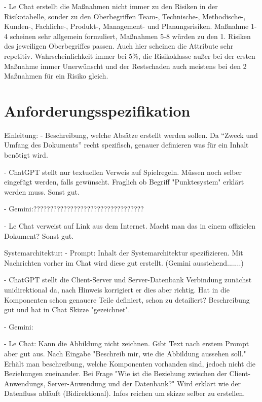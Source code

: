 - Le Chat erstellt die Maßnahmen nicht immer zu den Risiken in der Risikotabelle, sonder zu den Oberbegriffen Team-, Technische-, Methodische-, 
Kunden-, Fachliche-, Produkt-, Management- und Planungsrisiken. Maßnahme 1-4 scheinen sehr allgemein formuliert, Maßnahmen 5-8 würden
zu den 1. Risiken des jeweiligen Oberbegriffes passen. Auch hier scheinen die Attribute sehr repetitiv. Wahrscheinlichkeit immer bei 5\%,
die Risikoklasse außer bei der ersten Maßnahme immer Unerwünscht und der Restschaden auch meistens bei den 2 Maßnahmen für ein Risiko gleich.

\section{Anforderungsspezifikation}  \label{CompAnforderungsspezifikation}

Einleitung:
- Beschreibung, welche Absätze erstellt werden sollen. Da ``Zweck und Umfang des Dokuments'' recht spezifisch, genauer definieren was für ein 
Inhalt benötigt wird.

- ChatGPT stellt nur textuellen Verweis auf Spielregeln. Müssen noch selber eingefügt werden, falls gewünscht. Fraglich ob Begriff "Punktesystem"
erklärt werden muss. Sonst gut.

- Gemini:?????????????????????????????????

- Le Chat verweist auf Link aus dem Internet. Macht man das in einem offizielen Dokument? Sonst gut.


Systemarchitektur:
- Prompt: Inhalt der Systemarchitektur spezifizieren. Mit Nachrichten vorher im Chat wird diese gut erstellt. (Gemini ausstehend.......)

- ChatGPT stellt die Client-Server und Server-Datenbank Verbindung zunächst unidirektional da, nach Hinweis korrigiert 
er dies aber richtig. Hat in die Komponenten schon genauere Teile definiert, schon zu detailiert? Beschreibung gut und 
hat in Chat Skizze "gezeichnet".

- Gemini: 

- Le Chat: Kann die Abbildung nicht zeichnen. Gibt Text nach erstem Prompt aber gut aus. Nach Eingabe "Beschreib mir, 
wie die Abbildung aussehen soll." Erhält man beschreibung, welche Komponenten vorhanden sind, jedoch nicht die 
Beziehungen zueinander. Bei Frage "Wie ist die Beziehung zwischen der Client-Anwendungs, Server-Anwendung und der 
Datenbank?" Wird erklärt wie der Datenfluss abläuft (Bidirektional). Infos reichen um skizze selber zu erstellen.


